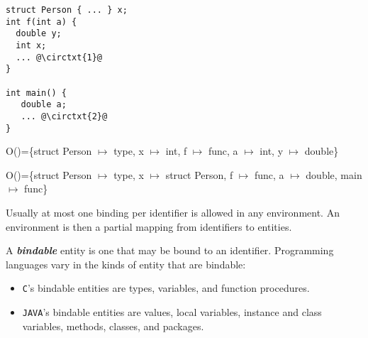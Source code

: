 \begin{listing}[H]
\begin{verbatim}
struct Person { ... } x;
int f(int a) { 
  double y;
  int x;
  ... @\circtxt{1}@
}

int main() {
   double a;
   ... @\circtxt{2}@
}
\end{verbatim}
\caption{}
\label{code:code3}
\end{listing}

\noindent O()=\{struct Person $\mapsto$ type, x $\mapsto$ int, f $\mapsto$ func, a $\mapsto$ int, y $\mapsto$ double\}

\noindent O()=\{struct Person $\mapsto$ type, x $\mapsto$ struct Person, f $\mapsto$ func, a $\mapsto$ double, main $\mapsto$ func\}

Usually at most one binding per identifier is allowed in any environment. An environment is then a partial mapping from identifiers to entities.

A \textit{\textbf{bindable}} entity is one that may be bound to an identifier. Programming languages vary in the kinds of entity that are bindable:
\begin{itemize}
  \item \texttt{C}'s bindable entities are types, variables, and function procedures.
  \item \texttt{JAVA}'s bindable entities are values, local variables, instance and class variables, methods, classes, and packages.
\end{itemize}
